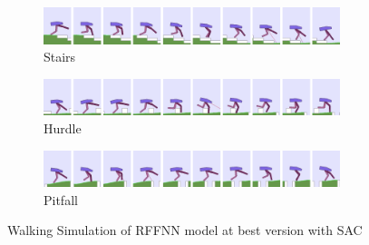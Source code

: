 \begin{figure}[!ht]
	\centering
	\begin{subfigure}{.95\textwidth}
		\centering
		\includegraphics[width=0.95\textwidth]{figures/bipedal/anim/ff-stairs.png}
		\caption{Stairs}
		\label{fig:anim_rffnn_stairs}
	\end{subfigure}
	\begin{subfigure}{.95\textwidth}
		\centering
		\includegraphics[width=0.95\textwidth]{figures/bipedal/anim/ff-hurdle.png}
		\caption{Hurdle}
		\label{fig:anim_rffnn_hurdle}
	\end{subfigure}
	\begin{subfigure}{.95\textwidth}
		\centering
		\includegraphics[width=0.95\textwidth]{figures/bipedal/anim/ff-pitfall.png}
		\caption{Pitfall}
		\label{fig:anim_rffnn_pitfall}
	\end{subfigure}
	\caption{Walking Simulation of RFFNN model at best version with SAC}
	\label{fig:rffnn_simulation}
\end{figure}

